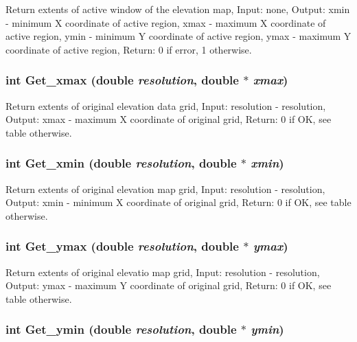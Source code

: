 Return extents of active window of the elevation map, Input: none, Output: xmin - minimum X coordinate of active region, xmax - maximum X coordinate of active region, ymin - minimum Y coordinate of active region, ymax - maximum Y coordinate of active region, Return: 0 if error, 1 otherwise. 

\hypertarget{GisApi_8C_a49}{
\subsubsection[Get\_\-xmax]{\setlength{\rightskip}{0pt plus 5cm}int Get\_\-xmax (double {\em resolution}, double $\ast$ {\em xmax})}}
\label{GisApi_8C_a49}


Return extents of original elevation data grid, Input: resolution - resolution, Output: xmax - maximum X coordinate of original grid, Return: 0 if OK, see table otherwise. 

\hypertarget{GisApi_8C_a50}{
\subsubsection[Get\_\-xmin]{\setlength{\rightskip}{0pt plus 5cm}int Get\_\-xmin (double {\em resolution}, double $\ast$ {\em xmin})}}
\label{GisApi_8C_a50}


Return extents of original elevation map grid, Input: resolution - resolution, Output: xmin - minimum X coordinate of original grid, Return: 0 if OK, see table otherwise. 

\hypertarget{GisApi_8C_a51}{
\subsubsection[Get\_\-ymax]{\setlength{\rightskip}{0pt plus 5cm}int Get\_\-ymax (double {\em resolution}, double $\ast$ {\em ymax})}}
\label{GisApi_8C_a51}


Return extents of original elevatio map grid, Input: resolution - resolution, Output: ymax - maximum Y coordinate of original grid, Return: 0 if OK, see table otherwise. 

\hypertarget{GisApi_8C_a52}{
\subsubsection[Get\_\-ymin]{\setlength{\rightskip}{0pt plus 5cm}int Get\_\-ymin (double {\em resolution}, double $\ast$ {\em ymin})}}
\label{GisApi_8C_a52}


